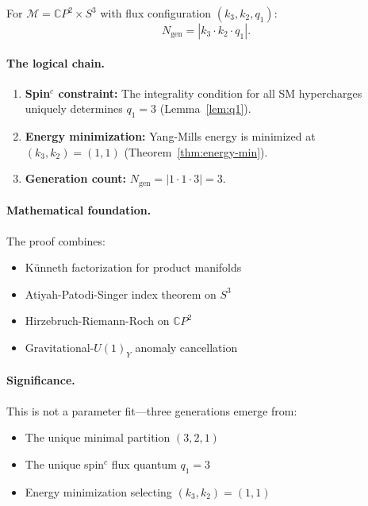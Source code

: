 \begin{theorem}
For $\mathcal{M} = \mathbb{C}P^2 \times S^3$ with flux configuration $(k_3, k_2, q_1)$:
\begin{equation}
N_{\text{gen}} = |k_3 \cdot k_2 \cdot q_1|.
\end{equation}
\end{theorem}

\paragraph{The logical chain.}
\begin{enumerate}
\item \textbf{Spin$^c$ constraint:} The integrality condition for all SM hypercharges uniquely determines $q_1 = 3$ (Lemma~\ref{lem:q1}).
\item \textbf{Energy minimization:} Yang-Mills energy is minimized at $(k_3, k_2) = (1, 1)$ (Theorem~\ref{thm:energy-min}).
\item \textbf{Generation count:} $N_{\text{gen}} = |1 \cdot 1 \cdot 3| = 3$.
\end{enumerate}

\paragraph{Mathematical foundation.}
The proof combines:
\begin{itemize}
\item K\"unneth factorization for product manifolds~\cite{AtiyahSinger1968}
\item Atiyah-Patodi-Singer index theorem on $S^3$~\cite{APS1975}
\item Hirzebruch-Riemann-Roch on $\mathbb{C}P^2$
\item Gravitational-$U(1)_Y$ anomaly cancellation
\end{itemize}

\paragraph{Significance.}
This is not a parameter fit---three generations emerge from:
\begin{itemize}
\item The unique minimal partition $(3,2,1)$
\item The unique spin$^c$ flux quantum $q_1 = 3$
\item Energy minimization selecting $(k_3, k_2) = (1,1)$
\end{itemize}

